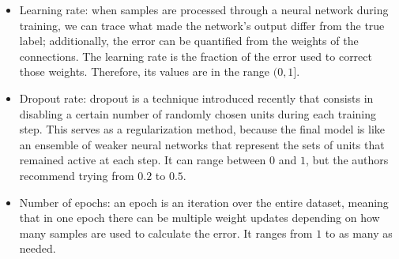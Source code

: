 	\begin{itemize}

		\item
		Learning rate: when samples are processed through a neural network during training, we can trace what made the network's output differ from the true label; additionally, the error can be quantified from the weights of the connections. The learning rate is the fraction of the error used to correct those weights. Therefore, its values are in the range $(0,1]$.

		\item
		Dropout rate: dropout is a technique introduced recently \cite{srivastava2014dropout} that consists in disabling a certain number of randomly chosen units during each training step. This serves as a regularization method, because the final model is like an ensemble of weaker neural networks that represent the sets of units that remained active at each step. It can range between $0$ and $1$, but the authors recommend trying from $0.2$ to $0.5$.

		\item
		Number of epochs: an epoch is an iteration over the entire dataset, meaning that in one epoch there can be multiple weight updates depending on how many samples are used to calculate the error. It ranges from $1$ to as many as needed.

	\end{itemize}
